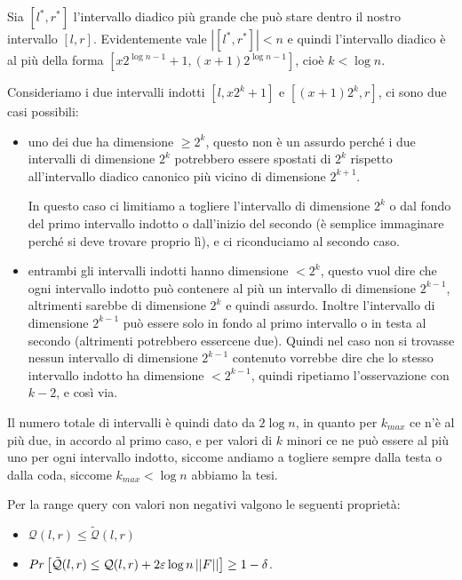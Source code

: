 \begin{proof*}
    Sia $[l^*, r^*]$ l'intervallo diadico più grande che può stare dentro il
    nostro intervallo $[l, r]$. Evidentemente vale $|[l^*, r^*]| < n$ e
    quindi l'intervallo diadico è al più della forma
    $[x2^{\log n-1}+1,(x+1)2^{\log n-1}]$, cioè $k < \log{n}$.

    Consideriamo i due intervalli indotti $[l, x2^{k}+1]$ e $[(x+1)2^{k}, r]$,
    ci sono due casi possibili:
    \begin{itemize}
        \item uno dei due ha dimensione $\ge 2^k$, questo non è un assurdo
        perché i due intervalli di dimensione $2^k$ potrebbero essere spostati
        di $2^k$ rispetto all'intervallo diadico canonico più vicino di
        dimensione $2^{k+1}$.

        In questo caso ci limitiamo a togliere l'intervallo di dimensione $2^k$
        o dal fondo del primo intervallo indotto o dall'inizio del secondo
        (è semplice immaginare perché si deve trovare proprio lì), e ci
        riconduciamo al secondo caso.

        \item entrambi gli intervalli indotti hanno dimensione $< 2^k$, questo
        vuol dire che ogni intervallo indotto può contenere al più un intervallo
        di dimensione $2^{k-1}$, altrimenti sarebbe di dimensione $2^k$ e quindi
        assurdo. Inoltre l'intervallo di dimensione $2^{k-1}$ può essere solo in
        fondo al primo intervallo o in testa al secondo (altrimenti potrebbero
        essercene due). Quindi nel caso non si trovasse nessun intervallo di
        dimensione $2^{k-1}$ contenuto vorrebbe dire che lo stesso intervallo
        indotto ha dimensione $< 2^{k-1}$, quindi ripetiamo l'osservazione con
        $k-2$, e così via.
    \end{itemize}

    Il numero totale di intervalli è quindi dato da $2 \log{n}$, in quanto
    per $k_{max}$ ce n'è al più due, in accordo al primo caso, e per valori
    di $k$ minori ce ne può essere al più uno per ogni intervallo indotto,
    siccome andiamo a togliere sempre dalla testa o dalla coda, siccome
    $k_{max} < \log{n}$ abbiamo la tesi.

\end{proof*}

\begin{lemma}[Approssimazione]
    Per la range query con valori non negativi valgono le seguenti proprietà:
    \begin{itemize}
        \item $\mathcal{Q}(l, r) \le \tilde{\mathcal{Q}}(l, r)$
        \item $Pr \left[\tilde{\mathcal{Q}}(l, r) \le \mathcal{Q}(l, r)
            + 2 \varepsilon \log{n} \left|\left|F\right|\right|\right] \ge 1-\delta$.
    \end{itemize}
\end{lemma}

